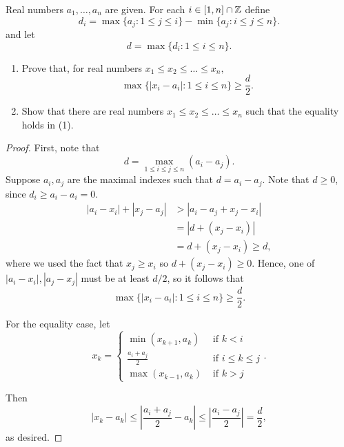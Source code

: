 \documentclass[11pt]{scrartcl}
\begin{document}
\begin{problem}
	[IMO 2007/1] Real numbers $a_1, \dots, a_n$ are given.  For each $i \in [1, n] \cap \mathbb Z$ define $$d_i = \max\{a_j: 1 \le j \le i\} - \min\{a_j : i \le j \le n\}.$$  and let $$d = \max\{d_i : 1 \le i \le n\}.$$
	\begin{enumerate}
	\item Prove that, for real numbers $x_1 \le x_2 \le \dots \le x_n,$ $$\max\{|x_i - a_i| : 1 \le i \le n\} \ge \frac{d}{2}.$$
	\item Show that there are real numbers $x_1 \le x_2 \le \dots \le x_n$ such that the equality holds in (1).
	\end{enumerate}
\end{problem}
\begin{proof}
First, note that $$d = \max_{1 \le i \le j \le n}(a_i - a_j).$$  Suppose $a_i, a_j$ are the maximal indexes such that $d = a_i - a_j$.  Note that $d \ge 0$, since $d_i \ge a_i - a_i = 0$. 
\begin{align*}
|a_i - x_i| + |x_j - a_j| &> |a_i - a_j + x_j - x_i| \\
&= |d + (x_j - x_i)|\\
&= d + (x_j - x_i) \ge d,
\end{align*}
where we used the fact that $x_j \ge x_i$ so $d + (x_j - x_i) \ge 0$.  Hence, one of $|a_i - x_i|, |a_j - x_j|$ must be at least $d/2$, so it follows that $$\max\{|x_i - a_i| : 1 \le i \le n\} \ge \frac{d}{2}.$$

For the equality case, let 
$$x_k = \begin{cases}
\min(x_{k+1}, a_k) & \text{ if } k < i \\ 
\frac{a_i+a_j}{2} & \text{ if } i \le k \le j\\ 
\max(x_{k-1}, a_k) & \text{ if } k > j 
\end{cases}.$$

Then $$|x_k - a_k| \le \left |\frac{a_i + a_j}{2} - a_k\right | \le \left |\frac{a_i - a_j}{2}\right | = \frac{d}{2},$$
as desired.
\end{proof}
\end{document}
